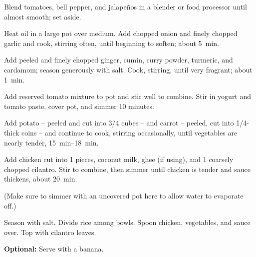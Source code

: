 \begin{recipe}
{		\step Blend tomatoes, bell pepper, and jalapeños in a blender or food processor until almost smooth; set aside.
		
		\step Heat oil in a large pot over medium. Add chopped onion and finely chopped garlic and cook, stirring often, until beginning to soften; about \SI{5}{\minute}. 
		
		\step Add peeled and finely chopped ginger, cumin, curry powder, turmeric, and cardamom; season generously with salt. Cook, stirring, until very fragrant; about \SI{1}{\minute}. 
		
		\step Add reserved tomato mixture to pot and stir well to combine. Stir in yogurt and tomato paste, cover pot, and simmer 10 minutes. 
		
		\step Add potato -- peeled and cut into \SI{3/4}{\inch} cubes -- and carrot -- peeled, cut into \SI{1/4}{\inch}-thick coins -- and continue to cook, stirring occasionally, until vegetables are nearly tender, \SIrange{15}{18}{\minute}.

		\step Add chicken cut into \SI{1}{\inch} pieces, coconut milk, ghee (if using), and \SI{1}{\cup} coarsely chopped cilantro. Stir to combine, then simmer until chicken is tender and sauce thickens, about \SI{20}{\minute}. 
		
		(Make sure to simmer with an uncovered pot here to allow water to evaporate off.) 
		
		\step Season with salt. Divide rice among bowls. Spoon chicken, vegetables, and sauce over. Top with cilantro leaves.
		
		\textbf{Optional:} Serve with a banana.
	}
    
\end{recipe}